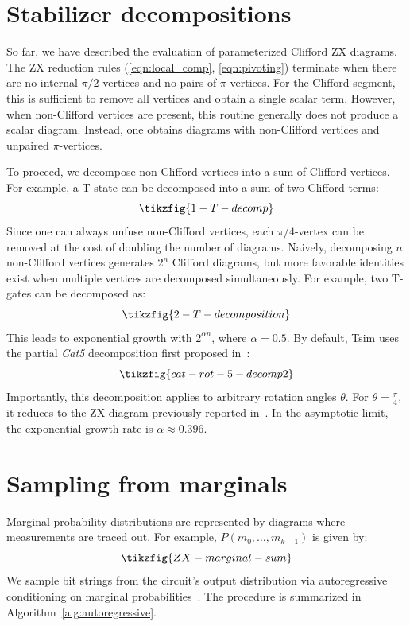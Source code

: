 \documentclass[
  a4paper,
  onecolumn,
  11pt,
  allowtoday
]{quantumarticle}
\begin{document}
\section{Stabilizer decompositions}
\label{sec:decomp}

So far, we have described the evaluation of parameterized Clifford ZX diagrams.
The ZX reduction rules (\ref{eqn:local_comp}, \ref{eqn:pivoting}) terminate when there are no internal $\pi/2$-vertices and no pairs
of $\pi$-vertices. For the Clifford segment, this is sufficient to remove all vertices
and obtain a single scalar term. However, when non-Clifford vertices are present, this
routine generally does not produce a scalar diagram. Instead, one obtains diagrams
with non-Clifford vertices and unpaired $\pi$-vertices.

To proceed, we decompose non-Clifford vertices into a sum of Clifford
vertices. For example, a T state can be decomposed into a sum of two Clifford terms:
\begin{equation}
  \tikzfig{1-T-decomp}
\end{equation}
Since one can always unfuse non-Clifford vertices, each $\pi/4$-vertex can be removed at the cost of doubling the number of diagrams. Naively, decomposing $n$ non-Clifford vertices generates $2^n$ Clifford diagrams, but more favorable identities exist when multiple vertices are decomposed simultaneously. For example, two T-gates can be decomposed as:
\begin{equation}
  \tikzfig{2-T-decomposition}
\end{equation}
This leads to exponential growth with $2^{\alpha n}$, where $\alpha=0.5$. By default, Tsim uses the partial \textit{Cat5} decomposition first proposed in~\cite{qassim2021improved}:
\begin{equation}
\label{eqn:cat5}
  \tikzfig{cat-rot-5-decomp2}
\end{equation}
Importantly, this decomposition applies to arbitrary rotation angles $\theta$. For $\theta=\frac{\pi}{4}$, it reduces to the ZX diagram previously reported
in~\cite{kissinger2022classical}.
In the asymptotic limit, the exponential growth rate is $\alpha\approx 0.396$.

\section{Sampling from marginals}

Marginal probability distributions are represented by diagrams where measurements are traced out. For example, $P(m_0,\dots,m_{k-1})$ is given by:
\begin{equation}
  \tikzfig{ZX-marginal-sum}
  \label{eqn:zx_marginal_sum}
\end{equation}
We sample bit strings from the circuit's output distribution via autoregressive conditioning on marginal probabilities~\cite{kissinger2022classical,kissinger2022simulating}. The procedure is summarized in Algorithm~\ref{alg:autoregressive}.
\end{document}
